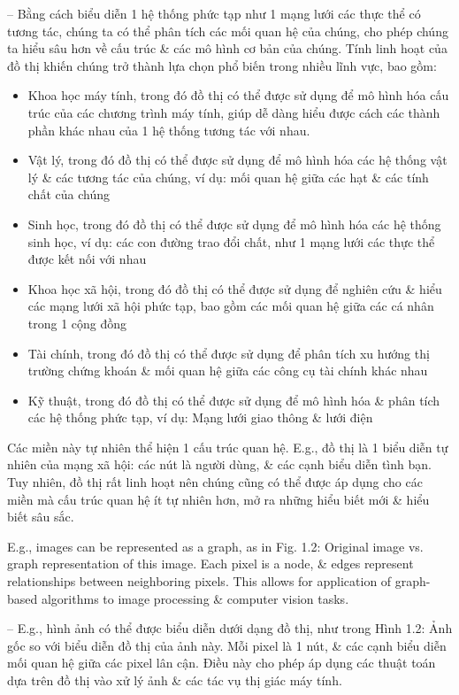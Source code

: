 \documentclass{article}
\begin{document}
\begin{itemize}
\begin{itemize}
        -- Bằng cách biểu diễn 1 hệ thống phức tạp như 1 mạng lưới các thực thể có tương tác, chúng ta có thể phân tích các mối quan hệ của chúng, cho phép chúng ta hiểu sâu hơn về cấu trúc \& các mô hình cơ bản của chúng. Tính linh hoạt của đồ thị khiến chúng trở thành lựa chọn phổ biến trong nhiều lĩnh vực, bao gồm:
        \begin{itemize}
            \item Khoa học máy tính, trong đó đồ thị có thể được sử dụng để mô hình hóa cấu trúc của các chương trình máy tính, giúp dễ dàng hiểu được cách các thành phần khác nhau của 1 hệ thống tương tác với nhau.
            \item Vật lý, trong đó đồ thị có thể được sử dụng để mô hình hóa các hệ thống vật lý \& các tương tác của chúng, ví dụ: mối quan hệ giữa các hạt \& các tính chất của chúng
            \item Sinh học, trong đó đồ thị có thể được sử dụng để mô hình hóa các hệ thống sinh học, ví dụ: các con đường trao đổi chất, như 1 mạng lưới các thực thể được kết nối với nhau
            \item Khoa học xã hội, trong đó đồ thị có thể được sử dụng để nghiên cứu \& hiểu các mạng lưới xã hội phức tạp, bao gồm các mối quan hệ giữa các cá nhân trong 1 cộng đồng
            \item Tài chính, trong đó đồ thị có thể được sử dụng để phân tích xu hướng thị trường chứng khoán \& mối quan hệ giữa các công cụ tài chính khác nhau
            \item Kỹ thuật, trong đó đồ thị có thể được sử dụng để mô hình hóa \& phân tích các hệ thống phức tạp, ví dụ: Mạng lưới giao thông \& lưới điện
        \end{itemize}
        Các miền này tự nhiên thể hiện 1 cấu trúc quan hệ. E.g., đồ thị là 1 biểu diễn tự nhiên của mạng xã hội: các nút là người dùng, \& các cạnh biểu diễn tình bạn. Tuy nhiên, đồ thị rất linh hoạt nên chúng cũng có thể được áp dụng cho các miền mà cấu trúc quan hệ ít tự nhiên hơn, mở ra những hiểu biết mới \& hiểu biết sâu sắc.

        E.g., images can be represented as a graph, as in {\sf Fig. 1.2: Original image vs. graph representation of this image.} Each pixel is a node, \& edges represent relationships between neighboring pixels. This allows for application of graph-based algorithms to image processing \& computer vision tasks.

        -- E.g., hình ảnh có thể được biểu diễn dưới dạng đồ thị, như trong {\sf Hình 1.2: Ảnh gốc so với biểu diễn đồ thị của ảnh này.} Mỗi pixel là 1 nút, \& các cạnh biểu diễn mối quan hệ giữa các pixel lân cận. Điều này cho phép áp dụng các thuật toán dựa trên đồ thị vào xử lý ảnh \& các tác vụ thị giác máy tính.


\end{itemize}
\end{itemize}
\end{document}
